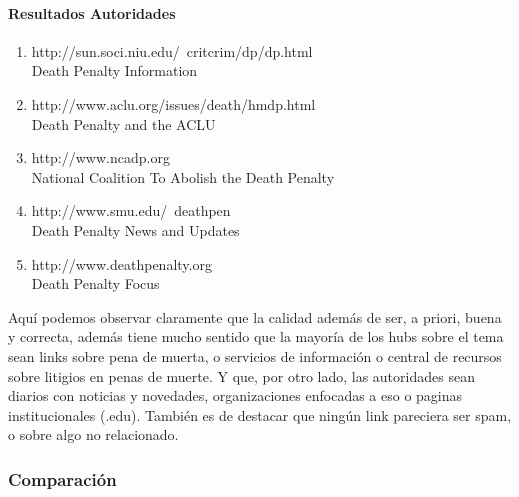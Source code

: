 \paragraph{Resultados Autoridades}
\begin{enumerate}
\item
http://sun.soci.niu.edu/~critcrim/dp/dp.html\\
Death Penalty Information
\item
http://www.aclu.org/issues/death/hmdp.html\\
Death Penalty and the ACLU
\item
http://www.ncadp.org\\
National Coalition To Abolish the Death Penalty
\item
http://www.smu.edu/~deathpen\\
Death Penalty News and Updates
\item
http://www.deathpenalty.org\\
Death Penalty Focus


\end{enumerate}

Aquí podemos observar claramente que la calidad además de ser, a priori, buena y correcta, además tiene mucho sentido que la mayoría de los hubs sobre el tema sean links sobre pena de muerta, o servicios de información o central de recursos sobre litigios en penas de muerte. Y que, por otro lado, las autoridades sean diarios con noticias y novedades, organizaciones enfocadas a eso o paginas institucionales (.edu). También es de destacar que ningún link pareciera ser spam, o sobre algo no relacionado.

\subsubsection{Comparación}

